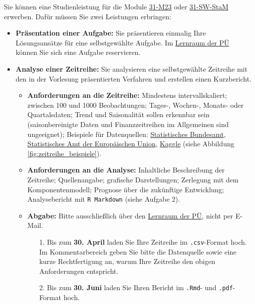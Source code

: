 Sie können eine Studienleistung für die Module \href{https://ekvv.uni-bielefeld.de/sinfo/publ/modul/26802869}{31-M23} oder \href{https://ekvv.uni-bielefeld.de/sinfo/publ/modul/47135019}{31-SW-StaM} erwerben. Dafür müssen Sie zwei Leistungen erbringen:
\begin{itemize}
    \item \textbf{Präsentation einer Aufgabe:} Sie präsentieren einmalig Ihre Lösungsansätze für eine selbstgewählte Aufgabe. Im \href{https://moodle.uni-bielefeld.de/course/view.php?id=1035}{Lernraum der PÜ} können Sie sich eine Aufgabe reservieren.
    \item \textbf{Analyse einer Zeitreihe:} Sie analysieren eine selbstgewählte Zeitreihe mit den in der Vorlesung präsentierten Verfahren und erstellen einen Kurzbericht.
    \begin{itemize}
        \item \textbf{Anforderungen an die Zeitreihe:} Mindestens intervallskaliert; zwischen 100 und 1000 Beobachtungen; Tages-, Wochen-, Monats- oder Quartalsdaten; Trend und Saisonalität sollen erkennbar sein (saisonbereinigte Daten und Finanzzeitreihen im Allgemeinen sind ungeeignet); Beispiele für Datenquellen: \href{https://www-genesis.destatis.de/genesis/online}{Statistisches Bundesamt}, \href{https://ec.europa.eu/eurostat/de/}{Statistisches Amt der Europäischen Union}, \href{https://www.kaggle.com/datasets?search=time+series}{Kaggle} (siehe Abbildung \ref{fig:zeitreihe_beispiele}).
        \item \textbf{Anforderungen an die Analyse:} Inhaltliche Beschreibung der Zeitreihe; Quellenangabe; grafische Darstellungen; Zerlegung mit dem Komponentenmodell; Prognose über die zukünftige Entwicklung; Analysebericht mit \texttt{R Markdown} (siehe Aufgabe 2).
        \item \textbf{Abgabe:} 
        Bitte ausschließlich über den \href{https://moodle.uni-bielefeld.de/course/view.php?id=1035}{Lernraum der PÜ}, nicht per E-Mail.
        \begin{itemize}
            \item[1.] Bis zum \textbf{30. April} laden Sie Ihre Zeitreihe im \texttt{.csv}-Format hoch. Im Kommentarbereich geben Sie bitte die Datenquelle sowie eine kurze Rechtfertigung an, warum Ihre Zeitreihe den obigen Anforderungen entspricht.
            \item[2.] Bis zum \textbf{30. Juni} laden Sie Ihren Bericht im \texttt{.Rmd}- und \texttt{.pdf}-Format hoch.
        \end{itemize}
    \end{itemize}
\end{itemize}

